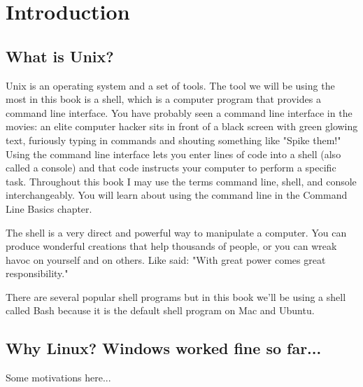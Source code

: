\chapter{Introduction}

\section{What is Unix?}

Unix is an operating system and a set of tools. The tool we will be using the 
most in this book is a shell, which is a computer program that provides a
command line interface. You have probably seen a command line interface in the 
movies: an elite computer hacker sits in front of a black screen with green 
glowing text, furiously typing in commands and shouting something like 
"Spike them!" Using the command line interface lets you enter lines of code into
a shell (also called a console) and that code instructs your computer to
perform a specific task. Throughout this book I may use the terms command line,
shell, and console interchangeably. You will learn about using the command line
in the Command Line Basics chapter.

The shell is a very direct and powerful way to manipulate a computer. You 
can produce wonderful creations that help thousands of people, or you can wreak
havoc on yourself and on others. Like
said: "With great power comes great responsibility."

There are several popular shell programs but in this book we'll be using a shell 
called Bash because it is the default shell program on Mac and Ubuntu.

\section{Why Linux? Windows worked fine so far...}

Some motivations here...
